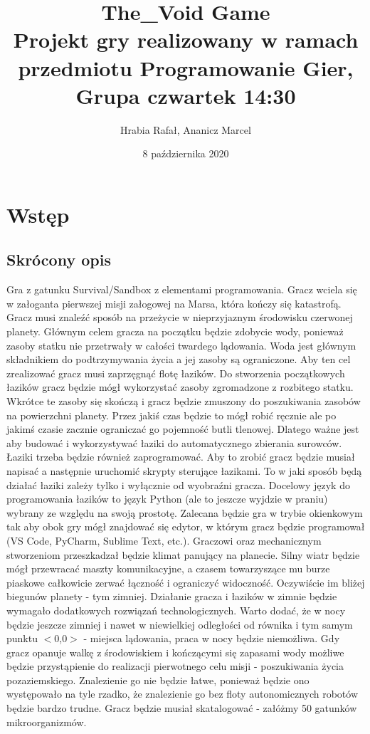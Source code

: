 \documentclass[a4paper,12pt]{article}
\author{Hrabia Rafał, Ananicz Marcel}
\title{
The\_Void Game \\
\vspace{1em}
\small Projekt gry realizowany w ramach przedmiotu Programowanie Gier,\\
Grupa czwartek 14:30
}
\date{8 października 2020}
\begin{document}
\maketitle

\pagebreak

\tableofcontents

\pagebreak

\section{Wstęp}
\subsection{Skrócony opis}

Gra z gatunku Survival/Sandbox z elementami programowania. Gracz wciela się w załoganta pierwszej misji załogowej na Marsa, która kończy się katastrofą. Gracz musi znaleźć sposób na przeżycie w nieprzyjaznym środowisku czerwonej planety. Głównym celem gracza na początku będzie zdobycie wody, ponieważ zasoby statku nie przetrwały w całości twardego lądowania. Woda jest głównym składnikiem do podtrzymywania życia a jej zasoby są ograniczone. Aby ten cel zrealizować gracz musi zaprzęgnąć flotę łazików. Do stworzenia początkowych łazików gracz będzie mógł wykorzystać zasoby zgromadzone z rozbitego statku. Wkrótce te zasoby się skończą i gracz będzie zmuszony do poszukiwania zasobów na powierzchni planety. Przez jakiś czas będzie to mógł robić ręcznie ale po jakimś czasie zacznie ograniczać go pojemność butli tlenowej. Dlatego ważne jest aby budować i wykorzystywać łaziki do automatycznego zbierania surowców. Łaziki trzeba będzie również zaprogramować. Aby to zrobić gracz będzie musiał napisać a następnie uruchomić skrypty sterujące łazikami. To w jaki sposób będą działać łaziki zależy tylko i wyłącznie od wyobraźni gracza. Docelowy język do programowania łazików to język Python (ale to jeszcze wyjdzie w praniu) wybrany ze względu na swoją prostotę. Zalecana będzie gra w trybie okienkowym tak aby obok gry mógł znajdować się edytor, w którym gracz będzie programował (VS Code, PyCharm, Sublime Text, etc.). Graczowi oraz mechanicznym stworzeniom przeszkadzał będzie klimat panujący na planecie. Silny wiatr będzie mógł przewracać maszty komunikacyjne, a czasem towarzyszące mu burze piaskowe całkowicie zerwać łączność i ograniczyć widoczność. Oczywiście im bliżej biegunów planety - tym zimniej. Działanie gracza i łazików w zimnie będzie wymagało dodatkowych rozwiązań technologicznych. Warto dodać, że w nocy będzie jeszcze zimniej i nawet w niewielkiej odległości od równika i tym samym punktu $<$0,0$>$ - miejsca lądowania, praca w nocy będzie niemożliwa. Gdy gracz opanuje walkę z środowiskiem i kończącymi się zapasami wody możliwe będzie przystąpienie do realizacji pierwotnego celu misji - poszukiwania życia pozaziemskiego. Znalezienie go nie będzie łatwe, ponieważ będzie ono występowało na tyle rzadko, że znalezienie go bez floty autonomicznych robotów będzie bardzo trudne. Gracz będzie musiał skatalogować - załóżmy 50 gatunków mikroorganizmów.
\end{document}
